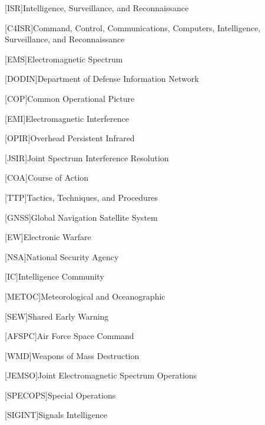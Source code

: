 [ISR]{Intelligence, Surveillance, and Reconnaissance}

[C4ISR]{Command, Control, Communications, Computers, Intelligence, Surveillance, and Reconnaissance}

[EMS]{Electromagnetic Spectrum}

[DODIN]{Department of Defense Information Network}

[COP]{Common Operational Picture}

[EMI]{Electromagnetic Interference}

[OPIR]{Overhead Persistent Infrared}

[JSIR]{Joint Spectrum Interference Resolution}

[COA]{Course of Action}

[TTP]{Tactics, Techniques, and Procedures}

[GNSS]{Global Navigation Satellite System}

[EW]{Electronic Warfare}

[NSA]{National Security Agency}

[IC]{Intelligence Community}

[METOC]{Meteorological and Oceanographic}

[SEW]{Shared Early Warning}

[AFSPC]{Air Force Space Command}

[WMD]{Weapons of Mass Destruction}

[JEMSO]{Joint Electromagnetic Spectrum Operations}

[SPECOPS]{Special Operations}

[SIGINT]{Signals Intelligence}
